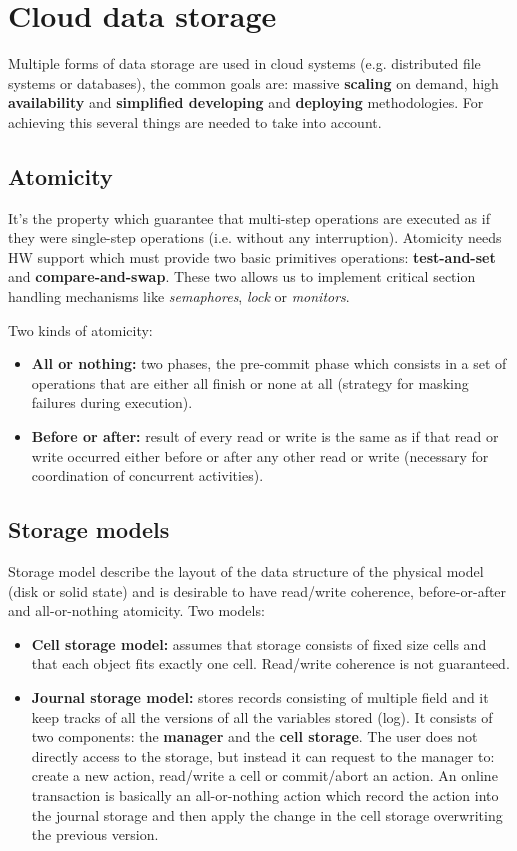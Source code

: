 \documentclass{article}
\begin{document}
\section{Cloud data storage}
Multiple forms of data storage are used in cloud systems (e.g. distributed file systems or databases), the common goals are: massive \textbf{scaling} on demand, high \textbf{availability} and \textbf{simplified developing} and \textbf{deploying} methodologies. For achieving this several things are needed to take into account.

\subsection{Atomicity}
It's the property which guarantee that multi-step operations are executed as if they were single-step operations (i.e. without any interruption). Atomicity needs HW support which must provide two basic primitives operations: \textbf{test-and-set} and \textbf{compare-and-swap}. These two allows us to implement critical section handling mechanisms like \textit{semaphores}, \textit{lock} or \textit{monitors}.

\bigskip
Two kinds of atomicity:
\begin{itemize}
    \item \textbf{All or nothing:} two phases, the pre-commit phase which consists in a set of operations that are either all finish or none at all (strategy for masking failures during execution).
    \item \textbf{Before or after:} result of every read or write is the same as if that read or write occurred either before or after any other read or write (necessary for coordination of concurrent activities).
\end{itemize}

\subsection{Storage models}
Storage model describe the layout of the data structure of the physical model (disk or solid state) and is desirable to have read/write coherence, before-or-after and all-or-nothing atomicity. Two models:
\begin{itemize}
    \item \textbf{Cell storage model:} assumes that storage consists of fixed size cells and that each object fits exactly one cell. Read/write coherence is not guaranteed.
    \item \textbf{Journal storage model:} stores records consisting of multiple field and it keep tracks of all the versions of all the variables stored (log). It consists of two components: the \textbf{manager} and the \textbf{cell storage}. The user does not directly access to the storage, but instead it can request to the manager to: create a new action, read/write a cell or commit/abort an action. An online transaction is basically an all-or-nothing action which record the action into the journal storage and then apply the change in the cell storage overwriting the previous version.
\end{itemize}
\end{document}
